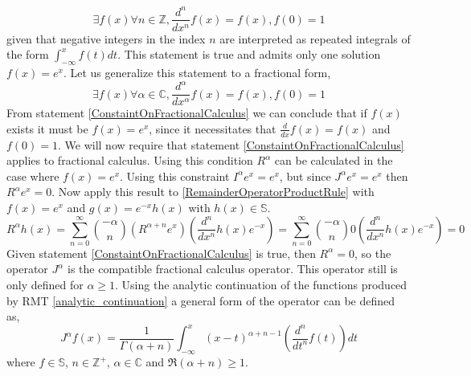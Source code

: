 \documentclass[%
 onecolumn,
 amsmath, amssymb, aps, pra, 10pt
]{revtex4-2}
\begin{document}
\[\exists f(x) \forall n \in \mathbb{Z}, \frac{d^n}{dx^n}f(x) = f(x), f(0) = 1\]
given that negative integers in the index $n$ are interpreted as repeated integrals of the form $\int_{-\infty}^x f(t)dt$. This statement is true and admits only one solution $f(x) = e^x$. Let us generalize this statement to a fractional form,
\begin{equation}
\exists f(x) \forall \alpha \in \mathbb{C}, \frac{d^\alpha}{dx^\alpha}f(x) = f(x), f(0) = 1
\label{ConstaintOnFractionalCalculus}
\end{equation}
From statement \eqref{ConstaintOnFractionalCalculus} we can conclude that if $f(x)$ exists it must be $f(x) = e^x$, since it necessitates that $\frac{d}{dx}f(x) = f(x)$ and $f(0) = 1$. We will now require that statement \eqref{ConstaintOnFractionalCalculus} applies to fractional calculus. Using this condition $R^\alpha$ can be calculated in the case where $f(x) = e^x$. Using this constraint $I^\alpha e^x = e^x$, but since $J^\alpha e^x = e^x$ then $R^\alpha e^x = 0$. Now apply this result to \eqref{RemainderOperatorProductRule} with $f(x) = e^x$ and $g(x) = e^{-x}h(x)$ with $h(x) \in \mathbb{S}$.
\[R^\alpha h(x) = \sum_{n=0}^\infty \binom{-\alpha}{n}\left( R^{\alpha + n}e^x \right)\left( \frac{d^n}{dx^n} h(x)e^{-x}\right) = \sum_{n=0}^\infty \binom{-\alpha}{n} 0 \left( \frac{d^n}{dx^n} h(x)e^{-x}\right) = 0\]
Given statement \eqref{ConstaintOnFractionalCalculus} is true, then $R^\alpha = 0$, so the operator $J^{\alpha}$ is the compatible fractional calculus operator. This operator still is only defined for $\mathfrak{\alpha} \geq 1$. Using the analytic continuation of the functions produced by RMT \eqref{analytic_continuation} a general form of the operator can be defined as,
\begin{equation}
J^{\alpha}f(x) = \frac{1}{\Gamma(\alpha+n)}\int_{-\infty}^x (x-t)^{\alpha+n-1}\left( \frac{d^n}{dt^n} f(t) \right)dt
\label{fractional_calculus}
\end{equation}
where $f \in \mathbb{S}$, $n \in \mathbb{Z}^+$, $\alpha \in \mathbb{C}$ and $\mathfrak{R}(\alpha + n) \geq 1$.
\end{document}
